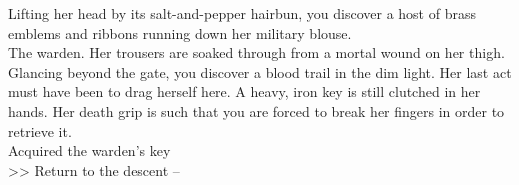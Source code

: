 Lifting her head by its salt-and-pepper hairbun, you discover a host of brass emblems and ribbons running down her military blouse.\\

The warden. Her trousers are soaked through from a mortal wound on her thigh. Glancing beyond the gate, you discover a blood trail in the dim light. Her last act must have been to drag herself here. A heavy, iron key is still clutched in her hands. Her death grip is such that you are forced to break her fingers in order to retrieve it.\\
 Acquired the warden's key\\

>> Return to the descent -- 